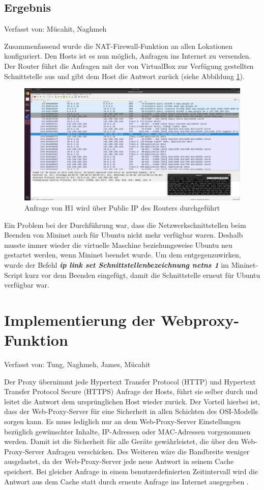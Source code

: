 \documentclass[fontsize=12pt,paper=a4,open=any,parskip=half,
  twoside=false,toc=listof,toc=bibliography,fleqn,leqno,
  captions=nooneline,captions=tableabove,british]{scrbook}
\begin{document}
\subsection{Ergebnis}
{\tiny Verfasst von: Mücahit, Naghmeh\par}
Zusammenfassend wurde die NAT-Firewall-Funktion an allen Lokationen konfiguriert. Den Hosts ist es nun möglich, Anfragen ins Internet zu versenden. Der Router führt die Anfragen mit der von VirtualBox zur Verfügung gestellten Schnittstelle aus und gibt dem Host die Antwort zurück (siehe Abbildung \ref{nat}).

\begin{figure}[H]
 \centering
 \includegraphics[width=1.0\textwidth]{Bilder/nat}
 \captionsetup{justification=centering}
 \caption{Anfrage von H1 wird über Public IP des Routers durchgeführt}
 \label{nat}
\end{figure}

Ein Problem bei der Durchführung war, dass die Netzwerkschnittstellen beim Beenden von Mininet auch für Ubuntu nicht mehr verfügbar waren. Deshalb musste immer wieder die virtuelle Maschine beziehungsweise Ubuntu neu gestartet werden, wenn Mininet beendet wurde. Um dem entgegenzuwirken, wurde der Befehl \textit{\textbf{ip link set Schnittstellenbezeichnung netns 1}} im Mininet-Script kurz vor dem Beenden eingefügt, damit die Schnittstelle erneut für Ubuntu verfügbar war.

\newpage
\section{Implementierung der Webproxy-Funktion}
{\tiny Verfasst von: Tung, Naghmeh, James, Mücahit\par}
Der Proxy übernimmt jede Hypertext Transfer Protocol (HTTP) und Hypertext Transfer Protocol Secure (HTTPS) Anfrage der Hosts, führt sie selber durch und leitet die Antwort dem ursprünglichen Host wieder zurück. Der Vorteil hierbei ist, dass der Web-Proxy-Server für eine Sicherheit in allen Schichten des OSI-Modells sorgen kann. Es muss lediglich nur an dem Web-Proxy-Server Einstellungen bezüglich gewünschter Inhalte, IP-Adressen oder MAC-Adressen vorgenommen werden. Damit ist die Sicherheit für alle Geräte gewährleistet, die über den Web-Proxy-Server Anfragen verschicken. Des Weiteren wäre die Bandbreite weniger ausgelastet, da der Web-Proxy-Server jede neue Antwort in seinem Cache speichert. Bei gleicher Anfrage in einem benutzerdefinierten Zeitintervall wird die Antwort aus dem Cache statt durch erneute Anfrage ins Internet ausgegeben \cite{webproxyosi}.
\end{document}
